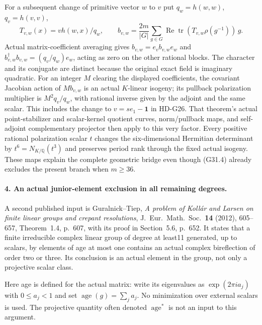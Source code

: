 For a subsequent change of primitive vector $w$ to $v$ put
$q_w=h(w,w)$, $q_v=h(v,v)$,
\[
 T_{v,w}(x)=v h(w,x)/q_w,\qquad
 b_{v,w}=\frac{2m}{|G|}\sum_{g\in G}
       \operatorname{Re}\operatorname{tr}
          (T_{v,w}\rho(g^{-1}))\,g.                        \tag{G31.10}
\]
Actual matrix-coefficient averaging gives
$b_{v,w}=e_vb_{v,w}e_w$ and
$b_{v,w}^{\dagger}b_{v,w}=(q_v/q_w)e_w$, acting as zero
on the other rational blocks.  The character and its conjugate
are distinct because the original exact field is imaginary
quadratic.  For an integer $M$ clearing the displayed
coefficients, the covariant Jacobian action of $Mb_{v,w}$ is
an actual $K$-linear isogeny; its pullback polarization multiplier
is $M^2q_v/q_w$, with rational inverse given by the adjoint and
the same scalar.  This includes the change to
$v=se_1-\boldsymbol1$ in HD-G26.  That theorem's actual
point-stabilizer and scalar-kernel quotient curves, norm/pullback
maps, and self-adjoint complementary projector then apply to
this very factor.  Every positive rational polarization scalar
$t$ changes the six-dimensional Hermitian determinant by
$t^6=N_{K/\mathbb Q}(t^3)$ and preserves period rank through the
fixed actual isogeny.  These maps explain the complete geometric
bridge even though (G31.4) already excludes the present branch
when $m\ge36$.

\paragraph{4. An actual junior-element exclusion in all remaining degrees.}
A second published input is Guralnick--Tiep, \emph{A problem of
Koll\'ar and Larsen on finite linear groups and crepant
resolutions}, J.~Eur.~Math.~Soc.~\textbf{14} (2012), 605--657,
Theorem~1.4, p.~607, with its proof in Section~5.6,
p.~652.  It states that a finite irreducible complex linear
group of degree at least11 generated, up to scalars, by elements
of age at most one contains an actual complex bireflection of
order two or three.  Its conclusion is an actual element in
the group, not only a projective scalar class.

Here age is defined for the actual matrix: write its eigenvalues as
$\exp(2\pi i a_j)$ with $0\le a_j<1$ and set
$\operatorname{age}(g)=\sum_j a_j$.  No minimization over
external scalars is used.  The projective quantity often denoted
$\operatorname{age}^*$ is not an input to this argument.

